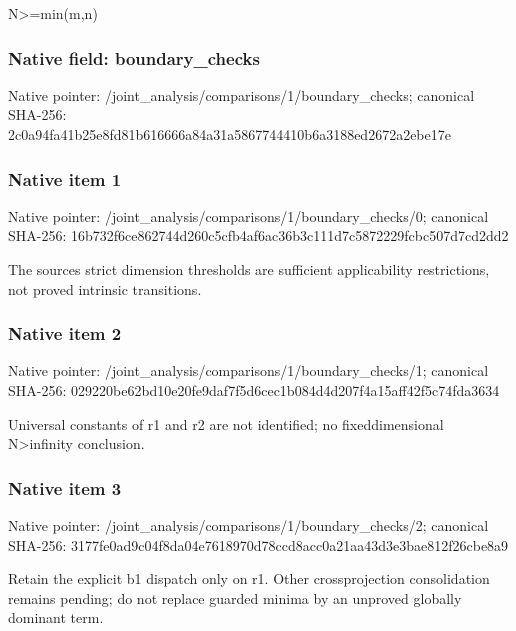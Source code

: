 \documentclass[10pt,a4paper]{article}
\begin{document}
N>=min(m,n)


\subsubsection{Native field: boundary\_checks}


Native pointer: /joint\_analysis/comparis\allowbreak{}ons/1/boundary\_checks; canonical SHA-256: 2c0a94fa41b25e8fd81b6166\allowbreak{}66a84a31a5867744410b6a31\allowbreak{}88ed2672a2ebe17e



\subsubsection{Native item 1}


Native pointer: /joint\_analysis/comparis\allowbreak{}ons/1/boundary\_checks/0; canonical SHA-256: 16b732f6ce862744d260c5cf\allowbreak{}b4af6ac36b3c111d7c587222\allowbreak{}9fcbc507d7cd2dd2


The sources strict dimension thresholds are sufficient applicability restrictions, not proved intrinsic transitions.


\subsubsection{Native item 2}


Native pointer: /joint\_analysis/comparis\allowbreak{}ons/1/boundary\_checks/1; canonical SHA-256: 029220be62bd10e20fe9daf7\allowbreak{}f5d6cec1b084d4d207f4a15a\allowbreak{}ff42f5c74fda3634


Universal constants of r1 and r2 are not identified; no fixeddimensional N>infinity conclusion.


\subsubsection{Native item 3}


Native pointer: /joint\_analysis/comparis\allowbreak{}ons/1/boundary\_checks/2; canonical SHA-256: 3177fe0ad9c04f8da04e7618\allowbreak{}970d78ccd8acc0a21aa43d3e\allowbreak{}3bae812f26cbe8a9


Retain the explicit b1 dispatch only on r1. Other crossprojection consolidation remains pending; do not replace guarded minima by an unproved globally dominant term.
\end{document}
